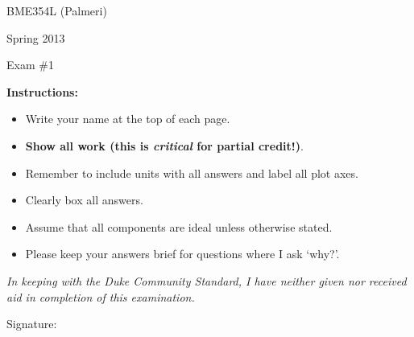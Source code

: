 

\vspace*{0.5in}

\centerline{\LARGE BME354L (Palmeri)}
\vspace*{0.25in}
\centerline{\LARGE Spring 2013}
\vspace*{0.25in}
\centerline{\LARGE Exam \#1}
\vspace*{0.25in}

{\bf Instructions:} 
\begin{itemize}
\item Write your name at the top of each page.
\item {\bf Show all work (this is {\it critical} for partial credit!)}.
\item Remember to include units with all answers and label all plot axes.
\item Clearly box all answers.
\item Assume that all components are ideal unless otherwise stated.
\item Please keep your answers brief for questions where I ask `why?'.
\end{itemize}

\vspace*{3in}

\emph{In keeping with the Duke Community Standard, I have neither given nor received aid in completion of this examination.}

\vspace*{0.5in}

Signature:\underline{\hspace*{3.0in}}
